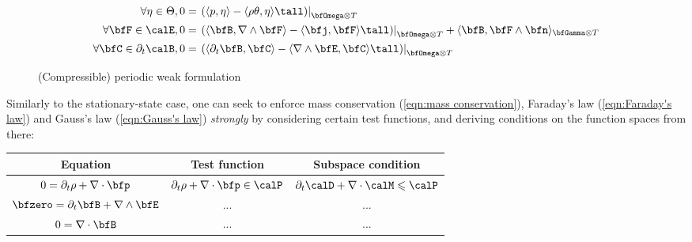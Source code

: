 \begin{figure}
\begin{align}
            \forall \eta \in \Theta,  0  &=  \left.\left(\langle p, \eta\rangle - \langle\rho\theta, \eta\rangle\tall\right)\right|_{\bfOmega\otimes T}  \\
            \forall \bfF \in \calE,  0  &=  \left.\left(\langle\bfB, \nabla\wedge\bfF\rangle - \langle\bfj, \bfF\rangle\tall\right)\right|_{\bfOmega\otimes T} + \langle\bfB, \bfF\wedge\bfn\rangle_{\bfGamma\otimes T}  \\
            \forall \bfC \in \partial_{t}\calB,  0  &=  \left.\left(\langle\partial_{t}\bfB, \bfC\rangle - \langle\nabla\wedge\bfE, \bfC\rangle\tall\right)\right|_{\bfOmega\otimes T}
        \end{align}
        \line
        \caption{(Compressible) periodic weak formulation}
        \label{fig:periodic weak form}
    \end{figure}

     Similarly to the stationary-state case, one can seek to enforce mass conservation (\ref{eqn:mass conservation}), Faraday's law (\ref{eqn:Faraday's law}) and Gauss's law (\ref{eqn:Gauss's law}) \emph{strongly} by considering certain test functions, and deriving conditions on the function spaces from there:
    \begin{center}\begin{tabular}{ c | c | c }
        Equation  &  Test function  &  Subspace condition  \\
        \hline\hline
        $0  =  \partial_{t}\rho + \nabla\cdot\bfp$         &  $\partial_{t}\rho + \nabla\cdot\bfp  \in  \calP$  &  $\partial_{t}\calD + \nabla\cdot\calM  \leqslant  \calP$  \\
        $\bfzero  =  \partial_{t}\bfB + \nabla\wedge\bfE$  &  ...                                               &  ...                                                       \\
        $0  =  \nabla\cdot\bfB$                            &  ...                                               &  ...                                                       \\
    \end{tabular}\end{center}

    
